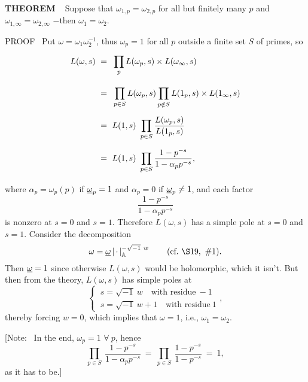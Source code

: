 \begin{x}{\small\bf THEOREM} \ %
Suppose that 
$\omega_{1,p} = \omega_{2,p}$ for all but finitely many $p$ and 
$\omega_{1,\infty} = \omega_{2,\infty}$ $-$then 
$\omega_1 = \omega_2$.  

\vspace{0.1cm}

PROOF \ 
Put $\omega = \omega_1 \omega_2^{-1}$, thus $\omega_p = 1$ for all $p$ outside a finite set $S$ of primes, so 
\begin{align*}
\allowdisplaybreaks
L(\omega,s) \ 
&=\vsx \ \prod_p L(\omega_p,s) \times L(\omega_\infty,s) \\
&=\vsx \ \prod_{p \in S} L(\omega_p,s) \prod_{p \notin S} L(1_p,s) \times L(1_\infty,s) \\
&=\vsx\ L(1,s) \ \prod_{p \in S} \frac{L(\omega_p,s)}{L(1_p,s)}\\
&=\vsx\ L(1,s) \ \prod_{p \in S} \frac{1 - p^{-s}}{1 - \alpha_p p^{-s}},
\end{align*}
where 
$\alpha_p = \omega_p(p)$ if $\underline{\omega}_p = 1$ and 
$\alpha_p = 0$ if $\underline{\omega}_p \neq 1$, and each factor 
\[
\frac{1 - p^{-s}}{1 - \alpha_pp^{-s}}
\]
is nonzero at $s = 0$ and $s = 1$.  
Therefore $L(\omega,s)$ has a simple pole at $s = 0$ and $s = 1$.  
Consider the decomposition
\[
\omega = \un{\omega} \acdot_\A^{-\sqrt{-1} \ w} \qquad (\text{cf.} \  \S19, \ \#1).
\]
Then $\underline{\omega} = 1$ since otherwise $L(\omega,s)$ would be holomorphic, which it isn't.  
But then from the theory, $L(\omega,s)$ has simple poles at
\[
\begin{cases}
\ s = \sqrt{-1} \  w \quad \text{with residue} \  -1\\
\ s = \sqrt{-1} \  w + 1 \quad \text{with residue} \  1
\end{cases}
,
\]
thereby forcing $w = 0$, which implies that $\omega = 1$, i.e., $\omega_1 = \omega_2$.   

\vspace{0.1cm}

[Note: \ In the end, $\omega_p = 1$ $\forall \ p$, hence 
\[
\prod\limits_{p \in S} \ \frac{1 - p^{-s}}{1 - \alpha_p p^{-s}} \ = \ 
\prod\limits_{p \in S} \ \frac{1 - p^{-s}}{1 - p^{-s}}  \ = \ 1,
\]
as it has to be.]
\end{x}





















